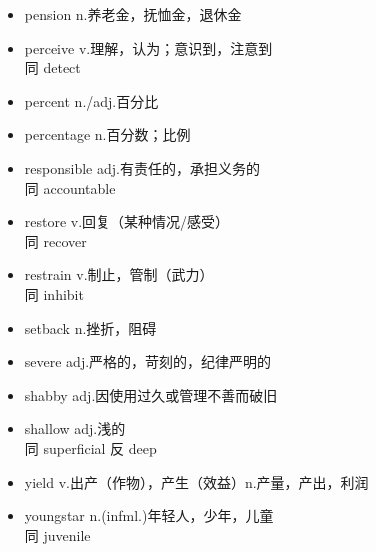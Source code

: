 \documentclass[11pt,a4paper,UTF8,titlepage]{ctexrep} %
\begin{document}
\begin{multicols}{2}
\begin{itemize}
        \item pension n.养老金，抚恤金，退休金
        \item perceive v.理解，认为；意识到，注意到\\同 detect
        \item percent n./adj.百分比
        \item percentage n.百分数；比例
        \item responsible adj.有责任的，承担义务的\\同 accountable
        \item restore v.回复（某种情况/感受）\\同 recover
        \item restrain v.制止，管制（武力）\\同 inhibit
        \item setback n.挫折，阻碍
        \item severe adj.严格的，苛刻的，纪律严明的
        \item shabby adj.因使用过久或管理不善而破旧
        \item shallow adj.浅的\\同 superficial 反 deep
        \item yield v.出产（作物），产生（效益）n.产量，产出，利润
        \item youngstar n.(infml.)年轻人，少年，儿童\\同 juvenile
    \end{itemize}
    \end{multicols}
\end{document}
